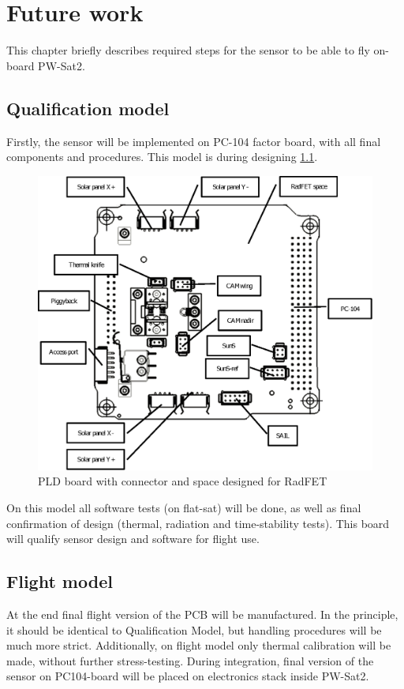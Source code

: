 \chapter{Future work}

This chapter briefly describes required steps for the sensor to be able to fly on-board PW-Sat2.

\section{Qualification model}
    Firstly, the sensor will be implemented on PC-104 factor board, with all final components and procedures. This model is during designing \ref{PLD_BOARD}.

    \begin{figure}[H]
        \centering
        \includegraphics[width=0.4\paperwidth]{img/08/PC104pldBoard.eps}
        \caption{PLD board with connector and space designed for RadFET}
        \label{PLD_BOARD}
    \end{figure}


    On this model all software tests (on flat-sat) will be done, as well as final confirmation of design (thermal, radiation and time-stability tests). This board will qualify sensor design and software for flight use.

\section{Flight model}
    At the end final flight version of the PCB will be manufactured. In the principle, it should be identical to Qualification Model, but handling procedures will be much more strict. Additionally, on flight model only thermal calibration will be made, without further stress-testing. During integration, final version of the sensor on PC104-board will be placed on electronics stack inside PW-Sat2.

